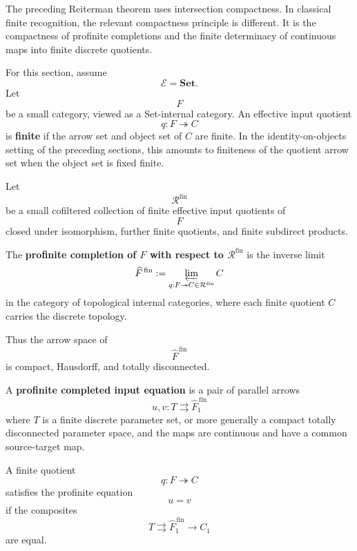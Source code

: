 The preceding Reiterman theorem uses intersection compactness. In classical
finite recognition, the relevant compactness principle is different. It is
the compactness of profinite completions and the finite determinacy of
continuous maps into finite discrete quotients.

For this section, assume
\[
\mathcal E=\mathbf{Set}.
\]
Let
\[
F
\]
be a small category, viewed as a Set-internal category. An effective input
quotient
\[
q:F\twoheadrightarrow C
\]
is \textbf{finite} if the arrow set and object set of \(C\) are finite. In
the identity-on-objects setting of the preceding sections, this amounts to
finiteness of the quotient arrow set when the object set is fixed finite.

\begin{definition}
\label{def:eilenberg-finite-quotient-collection}
Let
\[
\mathcal R^{\mathrm{fin}}
\]
be a small cofiltered collection of finite effective input quotients of
\[
F
\]
closed under isomorphism, further finite quotients, and finite subdirect
products.
\end{definition}

\begin{definition}
\label{def:eilenberg-profinite-completion}
The \textbf{profinite completion of \(F\) with respect to
\(\mathcal R^{\mathrm{fin}}\)} is the inverse limit
\[
\widehat F^{\,\mathrm{fin}}
:=
\varprojlim_{q:F\twoheadrightarrow C\in\mathcal R^{\mathrm{fin}}} C
\]
in the category of topological internal categories, where each finite
quotient \(C\) carries the discrete topology.
\end{definition}

Thus the arrow space of
\[
\widehat F^{\,\mathrm{fin}}
\]
is compact, Hausdorff, and totally disconnected.

\begin{definition}
\label{def:eilenberg-profinite-completed-equation}
A \textbf{profinite completed input equation} is a pair of parallel arrows
\[
u,v:T\rightrightarrows \widehat F^{\,\mathrm{fin}}_1
\]
where \(T\) is a finite discrete parameter set, or more generally a compact
totally disconnected parameter space, and the maps are continuous and have a
common source-target map.
\end{definition}

\begin{definition}
\label{def:eilenberg-profinite-satisfaction}
A finite quotient
\[
q:F\twoheadrightarrow C
\]
satisfies the profinite equation
\[
u=v
\]
if the composites
\[
T\rightrightarrows
\widehat F^{\,\mathrm{fin}}_1
\to
C_1
\]
are equal.
\end{definition}

